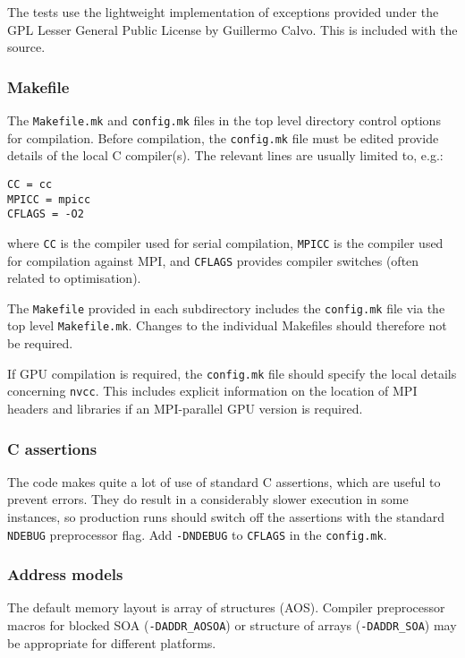 The tests use the lightweight implementation of exceptions provided
under the GPL Lesser General Public License by Guillermo Calvo. This
is included with the source.

\subsubsection{Makefile}

The \texttt{Makefile.mk} and \texttt{config.mk} files in the top level
directory control options for compilation. Before compilation,
the \texttt{config.mk} file must be edited provide details of the local
C compiler(s). The relevant lines are usually limited to, e.g.:
\begin{lstlisting}
CC = cc
MPICC = mpicc
CFLAGS = -O2
\end{lstlisting}
where \texttt{CC} is the compiler used for serial compilation,
\texttt{MPICC} is the compiler used for compilation against
MPI, and \texttt{CFLAGS} provides compiler switches (often
related to optimisation).

The \texttt{Makefile} provided in each subdirectory includes
the \texttt{config.mk} file via the top level \texttt{Makefile.mk}.
Changes to the individual Makefiles should therefore not be required.

If GPU compilation is required, the \texttt{config.mk} file should
specify the local details concerning \texttt{nvcc}. This includes
explicit information on the location of MPI headers and libraries
if an MPI-parallel GPU version is required.

\subsubsection{C assertions}

The code makes quite a lot of use of standard C assertions, which
are useful to prevent errors. They do result in a considerably
slower execution in some instances, so production runs should
switch off the assertions with the standard \texttt{NDEBUG}
preprocessor flag. Add \texttt{-DNDEBUG} to \texttt{CFLAGS} in
the \texttt{config.mk}.

\subsubsection{Address models}

The default memory layout is array of structures (AOS). Compiler
preprocessor macros for blocked SOA (\texttt{-DADDR\_AOSOA}) or
structure of arrays (\texttt{-DADDR\_SOA})
may be appropriate for different platforms.

